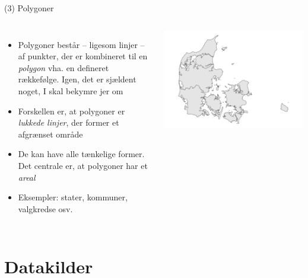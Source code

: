 \documentclass[
  8pt,
  ignorenonframetext,
  aspectratio=169]{beamer}
\newcommand{\columnsbegin}{\begin{columns}}
\newcommand{\columnsend}{\end{columns}}
\begin{document}
\begin{frame}{(3) Polygoner}
\protect\hypertarget{polygoner}{}
\columnsbegin
{}

\begin{itemize}
\item
  Polygoner består -- ligesom linjer -- af punkter, der er kombineret
  til en \emph{polygon} vha. en defineret rækkefølge. Igen, det er
  sjældent noget, I skal bekymre jer om
\item
  Forskellen er, at polygoner er \emph{lukkede linjer}, der former et
  afgrænset område
\item
  De kan have alle tænkelige former. Det centrale er, at polygoner har
  et \emph{areal}
\item
  Eksempler: stater, kommuner, valgkredse osv.
\end{itemize}


\tiny

\includegraphics[width=1\linewidth]{crashcourse_slides_files/figure-beamer/unnamed-chunk-5-1}

\normalsize

\columnsend
\end{frame}

\hypertarget{datakilder}{%
\section{Datakilder}\label{datakilder}}
\end{document}
